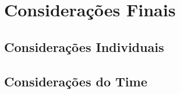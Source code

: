 \chapter[Considerações Finais]{Considerações Finais}
\label{chap:feedback}
	\section[Considerações Individuais]{Considerações Individuais}
	\label{sec:feedback_indv}
		

	\section[Considerações do Time]{Considerações do Time}
	\label{sec:feedback_time}
		